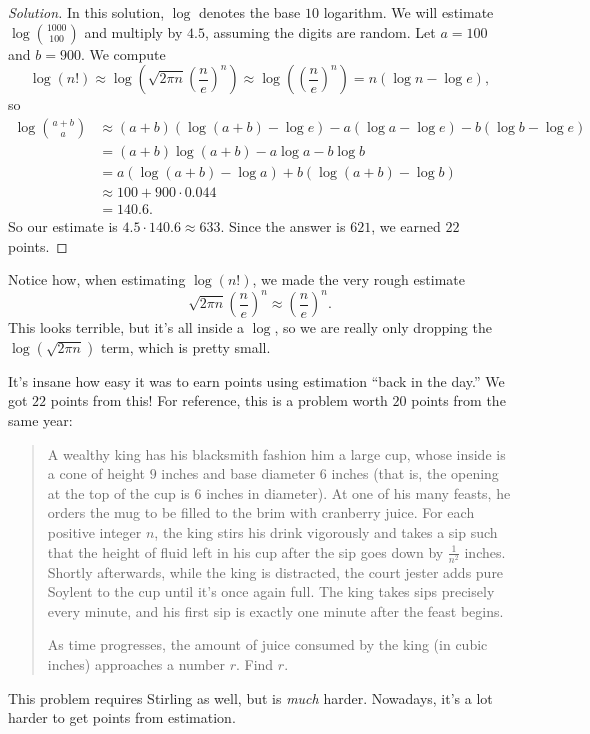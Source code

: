 \documentclass[11pt]{scrartcl}
\renewenvironment{solution}{\renewcommand\qedsymbol{$\blacksquare$}\begin{proof}[Solution]}{\end{proof}}
\begin{document}
\begin{solution}
    In this solution, $\log$ denotes the base $10$ logarithm. We will estimate $\log\binom{1000}{100}$ and multiply by $4.5$, assuming the digits are random. Let $a = 100$ and $b = 900$. We compute
    \[\log(n!) \approx \log\left(\sqrt{2\pi n}\left(\frac ne\right)^n\right) \approx \log\left(\left(\frac ne\right)^n\right) = n(\log n - \log e),\]
    so
    \begin{align*}
        \log\binom{a + b}{a} &\approx (a + b)(\log(a + b) - \log e) - a(\log a - \log e) - b(\log b - \log e) \\
        &= (a + b)\log(a + b) - a\log a - b\log b \\
        &= a(\log(a + b) - \log a) + b(\log(a + b) - \log b) \\
        &\approx 100 + 900 \cdot 0.044 \\
        &= 140.6.
    \end{align*}
    So our estimate is $4.5 \cdot 140.6 \approx 633$. Since the answer is $621$, we earned $22$ points.
\end{solution}

\begin{remark*}
    Notice how, when estimating $\log(n!)$, we made the very rough estimate
    \[\sqrt{2\pi n}\left(\frac ne\right)^n \approx \left(\frac ne\right)^n.\]
    This looks terrible, but it's all inside a $\log$, so we are really only dropping the $\log\left(\sqrt{2\pi n}\right)$ term, which is pretty small.
\end{remark*}

\begin{remark*}
	It's insane how easy it was to earn points using estimation ``back in the day.'' We got $22$ points from this! For reference, this is a problem worth $20$ points from the same year:
	\begin{quote}
		\sffamily\small
		A wealthy king has his blacksmith fashion him a large cup,
		whose inside is a cone of height $9$ inches and base diameter $6$ inches
		(that is, the opening at the top of the cup is 6 inches in diameter).
		At one of his many feasts, he orders the mug to be filled to the brim with cranberry juice.
		For each positive integer $n$, the king stirs his drink vigorously
		and takes a sip such that the height of fluid left in his cup after the sip goes down by $\frac1{n^2}$ inches.
		Shortly afterwards, while the king is distracted, the court jester adds
		pure Soylent to the cup until it's once again full. The king takes sips
		precisely every minute, and his first sip is exactly one minute after the feast begins.
		
		As time progresses, the amount of juice consumed by the king (in cubic inches) approaches a number $r$. Find $r$.
	\end{quote}
	This problem requires Stirling as well, but is \emph{much} harder. Nowadays, it's a lot harder to get points from estimation.
\end{remark*}
\end{document}
